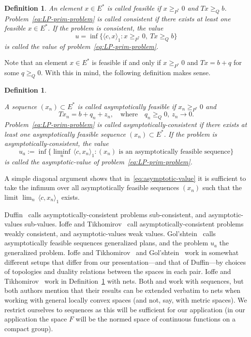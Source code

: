 \documentclass[[a4paper,english,12pt]{amsart}
\theoremstyle{plain}
\newtheorem{definition}[theorem]{Definition}
\theoremstyle{remark}
\begin{document}
\begin{definition}

An element $x \in E^*$ is called \emph{feasible} if $x \ge_{P^*} 0$ and $Tx  \ge_{Q} b$. Problem~\eqref{eq:LP-prim-problem} is called \emph{consistent} if there exists at least one feasible $x \in E^*$. If the problem is consistent, the value
$$
u = \inf \{ \langle c,x \rangle_1 : x \ge_{P^*} 0, \  Tx  \ge_{Q} b\}
$$
is called the \emph{value} of problem~\eqref{eq:LP-prim-problem}.

\end{definition}

Note that an element \(x \in E^*\) is feasible if and only if $x \ge_{P^*} 0$ and \(Tx = b + q\) for some \(q \ge_{Q} 0\). With this in mind, the following definition makes sense.

\begin{definition} \label{def:asymptotic-value}

A sequence $(x_n) \subset E^*$ is called \emph{asymptotically feasible} if $x_n \ge_{P^*} 0$ and
$$
T x_n = b + q_n + z_n, \quad \text{where} \quad q_n \ge_{Q} 0, \ z_n \to 0.
$$
Problem~\eqref{eq:LP-prim-problem} is called \emph{asymptotically-consistent} if there exists at least one asymptotically feasible sequence $(x_n) \subset E^*$. If the problem is asymptotically-consistent, the value
\begin{equation} \label{eq:asymptotic-value}
u_a := \inf \{ \liminf_{n} \, \langle c, x_n \rangle_1 : (x_n) \text{ is an asymptotically feasible sequence}  \}
\end{equation}
is called the \emph{asymptotic-value} of problem~\eqref{eq:LP-prim-problem}. 

\end{definition}

A simple diagonal argument shows that in~\eqref{eq:asymptotic-value} it is sufficient to take the infimum over all asymptotically feasible sequences $(x_n)$ such that the limit $\lim_n \, \langle c, x_n \rangle_1$ exists.

Duffin~\cite{Duffin} calls asymptotically-consistent problems sub-consistent, and asymptotic-values sub-values. Ioffe and Tikhomirov~\cite{I-T} call asymptotically-consistent problems weakly consistent, and asymptotic-values weak values. Gol'shtein~\cite{golstein} calls asymptotically feasible sequences generalized plans, and the problem $u_a$ the generalized problem. Ioffe and Tikhomirov~\cite{I-T} and Gol'shtein~\cite{golstein} work in somewhat different setups that differ from our presentation---and that of Duffin---by choices of topologies and duality relations between the spaces in each pair. Ioffe and Tikhomirov~\cite{I-T} work in Definition~\ref{def:asymptotic-value} with nets.  Both \cite{Duffin} and \cite{golstein} work with sequences, but both authors mention that their results can be extended verbatim to nets when working with general locally convex spaces (and not, say, with metric spaces). We restrict ourselves to sequences as this will be sufficient for our application (in our application the space $F$ will be the normed space of continuous functions on a compact group).
\end{document}
